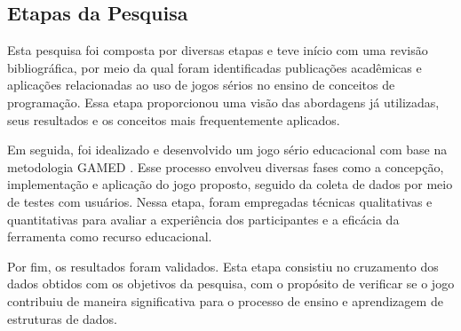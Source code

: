 \subsection{Etapas da Pesquisa}

Esta pesquisa foi composta por diversas etapas e teve início com uma revisão
bibliográfica, por meio da qual foram identificadas publicações acadêmicas e
aplicações relacionadas ao uso de jogos sérios no ensino de conceitos de
programação. Essa etapa proporcionou uma visão das abordagens já utilizadas,
seus resultados e os conceitos mais frequentemente aplicados.

Em seguida, foi idealizado e desenvolvido um jogo sério educacional com base na
metodologia GAMED \cite{aslan2015gamed}. Esse processo envolveu diversas fases como a
concepção, implementação e aplicação do jogo proposto, seguido da coleta de
dados por meio de testes com usuários. Nessa etapa, foram empregadas técnicas
qualitativas e quantitativas para avaliar a experiência dos participantes e a
eficácia da ferramenta como recurso educacional.

Por fim, os resultados foram validados. Esta etapa consistiu no cruzamento dos
dados obtidos com os objetivos da pesquisa, com o propósito de verificar se o
jogo contribuiu de maneira significativa para o processo de ensino e
aprendizagem de estruturas de dados.
